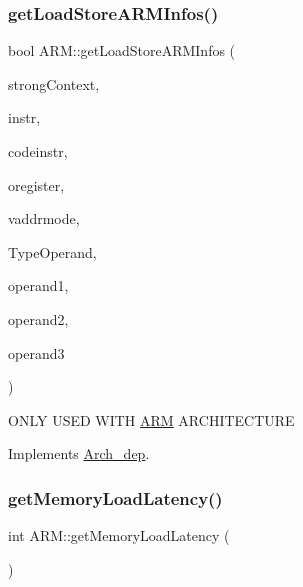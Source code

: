 \subsubsection{\texorpdfstring{get\+Load\+Store\+A\+R\+M\+Infos()}{getLoadStoreARMInfos()}}
{\footnotesize\ttfamily bool A\+R\+M\+::get\+Load\+Store\+A\+R\+M\+Infos (\begin{DoxyParamCaption}\item[{bool}]{strong\+Context,  }\item[{string \&}]{instr,  }\item[{string \&}]{codeinstr,  }\item[{string \&}]{oregister,  }\item[{\hyperlink{arch_8h_aa5cfff0cd9c5ad5ebda7aeecc4a50c2b}{Addressing\+Mode} $\ast$}]{vaddrmode,  }\item[{\hyperlink{arch_8h_a63b66e201ffc27bbc8f89c8808382044}{offset\+Type} $\ast$}]{Type\+Operand,  }\item[{string \&}]{operand1,  }\item[{string \&}]{operand2,  }\item[{string \&}]{operand3 }\end{DoxyParamCaption})\hspace{0.3cm}{\ttfamily [virtual]}}

O\+N\+LY U\+S\+ED W\+I\+TH \hyperlink{classARM}{A\+RM} A\+R\+C\+H\+I\+T\+E\+C\+T\+U\+RE 

Implements \hyperlink{classArch__dep_a18db69d3e03bcfbcf5b7d3b36b4f409c}{Arch\+\_\+dep}.

\mbox{\label{classARM_a39ad50b9e5d9909bd1f7c0ecbde69f25}} 
\subsubsection{\texorpdfstring{get\+Memory\+Load\+Latency()}{getMemoryLoadLatency()}}
{\footnotesize\ttfamily int A\+R\+M\+::get\+Memory\+Load\+Latency (\begin{DoxyParamCaption}{ }\end{DoxyParamCaption})}

\mbox{\label{classARM_a6ae1ddccf77484346590d15bf21ccba8}} 
